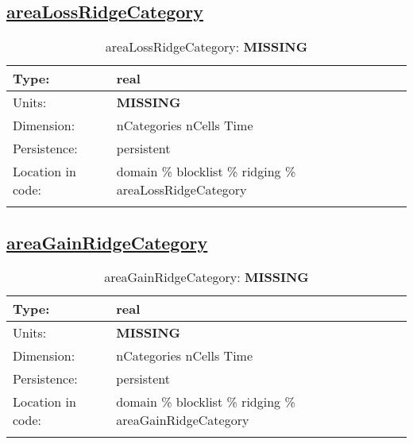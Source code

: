 \subsection[areaLossRidgeCategory]{\hyperref[sec:var_tab_ridging]{areaLossRidgeCategory}}
\label{subsec:var_sec_ridging_areaLossRidgeCategory}
\begin{center}
\begin{longtable}{| p{2.0in} | p{4.0in} |}
        \hline 
        Type: & real \\
        \hline 
        Units: & {\bf \color{red} MISSING} \\
        \hline 
        Dimension: & nCategories nCells Time \\
        \hline 
        Persistence: & persistent \\
        \hline 
         Location in code: & domain \% blocklist \% ridging \% areaLossRidgeCategory \\
         \hline 
    \caption{areaLossRidgeCategory: {\bf \color{red} MISSING}}
\end{longtable}
\end{center}
\subsection[areaGainRidgeCategory]{\hyperref[sec:var_tab_ridging]{areaGainRidgeCategory}}
\label{subsec:var_sec_ridging_areaGainRidgeCategory}
\begin{center}
\begin{longtable}{| p{2.0in} | p{4.0in} |}
        \hline 
        Type: & real \\
        \hline 
        Units: & {\bf \color{red} MISSING} \\
        \hline 
        Dimension: & nCategories nCells Time \\
        \hline 
        Persistence: & persistent \\
        \hline 
         Location in code: & domain \% blocklist \% ridging \% areaGainRidgeCategory \\
         \hline 
    \caption{areaGainRidgeCategory: {\bf \color{red} MISSING}}
\end{longtable}
\end{center}
